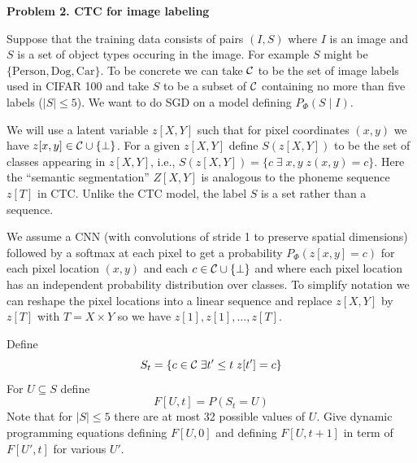 \documentclass{article}
\newcommand{\solution}[1]{}
\begin{document}
\bigskip
{\bf Problem 2. CTC for image labeling}

Suppose that the training data consists of pairs $(I,S)$ where $I$ is an image and $S$
is a set of object types occuring in the image.  For example $S$ might be $\{\mathrm{Person},\mathrm{Dog},\mathrm{Car}\}$.
To be concrete we can take ${\cal C}$ to be the set of image labels used in CIFAR 100 and take $S$ to be a subset
of ${\cal C}$ containing no more than five labels ($|S| \leq 5$).
We want to do SGD on a model defining $P_\Phi(S\;|\;I)$.

We will use a latent variable $z[X,Y]$ such that for pixel coordinates $(x,y)$ we have $z[x,y] \in {\cal C} \cup \{\bot\}$.
For a given $z[X,Y]$ define $S(z[X,Y])$ to be the set of classes appearing in $z[X,Y]$, i.e.,
$S(z[X,Y]) = \{c\;\exists\;x,y\;z(x,y) = c\}$. Here the ``semantic segmentation'' $Z[X,Y]$ is analogous to the phoneme
sequence $z[T]$ in CTC. Unlike the CTC model, the label
$S$ is a set rather than a sequence.

We assume a CNN (with convolutions of stride 1 to preserve spatial dimensions) followed by
a softmax at each pixel to get a probability
$P_\Phi(z[x,y] = c)$ for each pixel location $(x,y)$ and each $c \in {\cal C} \cup \{\bot\}$ and where
each pixel location has an independent probability distribution over classes. 
To simplify notation we can reshape the pixel locations into a linear sequence
and replace $z[X,Y]$ by $z[T]$ with $T = X \times Y$ so we have $z[1],z[1],\ldots,z[T]$.

Define
$$S_t = \{c \in {\cal C}\;\exists t'\leq t\;z[t'] = c\}$$
For $U \subseteq S$ define
$$F[U,t] = P(S_t = U)$$
Note that for $|S| \leq 5$ there are at most 32 possible values of $U$.
Give dynamic programming equations defining $F[U,0]$ and defining $F[U,t+1]$ in term of $F[U',t]$ for various $U'$.

\solution{
  
\begin{tabbing}
  {\color{red} $F[\emptyset,0] = 1$} \\
  For $U$ a nonempty subset of $S$ {\color{red} $F[U,0] = 0$} \\
  Fo\=r $t = 1,\dots,T$ \\
      \> Fo\=r $U \subseteq S$ \\
      \>     \> {\color{red} $F[U,t] = P(z[t] = \bot) F[U,t-1] + \sum_{c \in U} P(z[t] = c)(F[U\backslash c,t-1] + F[U,t-1])$}
\end{tabbing}
}


\bigskip
\bigskip
\end{document}
